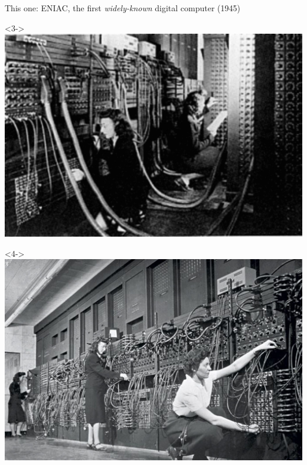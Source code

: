 \documentclass[aspectratio=169]{beamer}
\begin{document}
\begin{frame}{This one: ENIAC, the first {\it widely-known} digital computer (1945)}
\begin{onlyenv}<3->
\vspace{-7.5 cm}
\mbox{\hspace{1.75 cm}\includegraphics[height=7.5 cm]{PLOTS/eniac-3.jpg}}
\end{onlyenv}

\begin{onlyenv}<4->
\vspace{-7.5 cm}
\mbox{\hspace{2.75 cm}\includegraphics[height=7.5 cm]{PLOTS/eniac-4.jpg}}
\end{onlyenv}
\end{frame}
\end{document}
